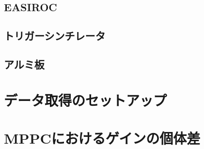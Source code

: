\subsection{EASIROC}

\subsection{トリガーシンチレータ}
\subsection{アルミ板}

\section{データ取得のセットアップ}

\section{MPPCにおけるゲインの個体差}